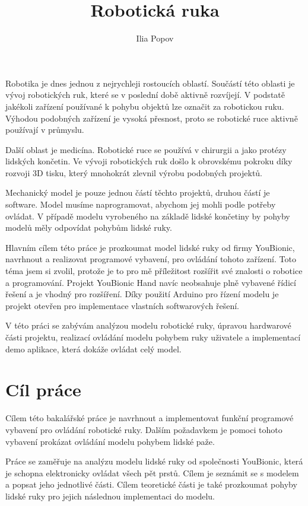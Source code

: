\documentclass[thesis=B,czech]{FITthesis}[2012/06/26]
\title{Robotická ruka}
\author{Ilia Popov} %
\begin{document}

\begin{introduction}


Robotika je dnes jednou z nejrychleji rostoucích oblastí. Součástí této oblasti je vývoj robotických ruk, které se v poslední době aktivně rozvíjejí. V podstatě jakékoli zařízení používané k pohybu objektů lze označit za robotickou ruku. Výhodou podobných zařízení je vysoká přesnost, proto se robotické ruce aktivně používají v průmyslu.


Další oblast je medicína. Robotické ruce se používá v chirurgii a jako protézy lidských končetin. Ve vývoji robotických ruk došlo k obrovskému pokroku díky rozvoji 3D tisku, který mnohokrát zlevnil výrobu podobných projektů.


Mechanický model je pouze jednou částí těchto projektů, druhou částí je software. Model musíme naprogramovat, abychom jej mohli podle potřeby ovládat. V případě modelu vyrobeného na základě lidské končetiny by pohyby modelů měly odpovídat pohybům lidské ruky.


Hlavním cílem této práce je prozkoumat model lidské ruky od firmy YouBionic, navrhnout a realizovat programové vybavení, pro ovládání tohoto zařízení. Toto téma jsem si zvolil, protože je to pro mě příležitost rozšířit své znalosti o robotice a programování. Projekt YouBionic Hand navíc neobsahuje plně vybavené řídicí řešení a je vhodný pro rozšíření. Díky použití Arduino pro řízení modelu je projekt otevřen pro implementace vlastních softwarových řešení.


V této práci se zabývám analýzou modelu robotické ruky, úpravou hardwarové části projektu, realizací ovládání modelu pohybem ruky uživatele a implementací demo aplikace, která dokáže ovládat celý model.


\end{introduction}

\chapter{Cíl práce}

Cílem této bakalářské práce je navrhnout a implementovat funkční programové vybavení pro ovládání robotické ruky. Dalším požadavkem je pomoci tohoto vybavení prokázat ovládání modelu pohybem lidské paže.


Práce se zaměřuje na analýzu modelu lidské ruky od společnosti YouBionic, která je schopna elektronicky ovládat všech pět prstů. Cílem je seznámit se s modelem a popsat jeho jednotlivé části. Cílem teoretické části je také prozkoumat pohyby lidské ruky pro jejich následnou implementaci do modelu.
\end{document}
